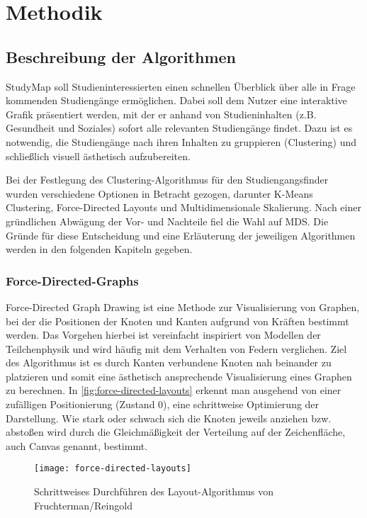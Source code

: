 \section{Methodik}\label{sec:methodik}
\subsection{Beschreibung der Algorithmen}
StudyMap soll Studieninteressierten einen schnellen Überblick über
alle in Frage kommenden Studiengänge ermöglichen.  Dabei soll dem Nutzer eine
interaktive Grafik präsentiert werden, mit der er anhand von Studieninhalten
(z.B. \glqq Gesundheit und Soziales\grqq{}) sofort alle relevanten Studiengänge
findet. Dazu ist es notwendig, die Studiengänge nach ihren Inhalten zu
gruppieren (Clustering) und schließlich visuell ästhetisch aufzubereiten.

Bei der Festlegung des Clustering-Algorithmus für den Studiengangsfinder wurden
verschiedene Optionen in Betracht gezogen, darunter K-Means Clustering,
Force-Directed Layouts und Multidimensionale Skalierung. Nach einer
gründlichen Abwägung der Vor- und Nachteile fiel die Wahl auf MDS. Die Gründe
für diese Entscheidung und eine Erläuterung der jeweiligen Algorithmen werden in
den folgenden Kapiteln gegeben.

\subsubsection{Force-Directed-Graphs}
Force-Directed Graph Drawing ist eine Methode zur Visualisierung von Graphen, bei der die Positionen der Knoten und Kanten aufgrund von Kräften bestimmt werden. Das Vorgehen hierbei ist vereinfacht inspiriert von Modellen der Teilchenphysik und wird häufig mit dem Verhalten von Federn verglichen. Ziel des Algorithmus ist es durch Kanten verbundene Knoten nah beinander zu platzieren und somit eine ästhetisch ansprechende Visualisierung eines Graphen zu berechnen. In \autoref{fig:force-directed-layouts} erkennt man ausgehend von einer zufälligen Positionierung (Zustand 0), eine schrittweise Optimierung der Darstellung. Wie stark oder schwach sich die Knoten jeweils \glqq anziehen\grqq{} bzw. \glqq abstoßen\grqq{} wird durch die Gleichmäßigkeit der Verteilung auf der Zeichenfläche, auch Canvas genannt, bestimmt. \parencite{schonfeld_fruchtermanreingold_2019}

\begin{figure}[H]
    \centering
    \texttt{[image: force-directed-layouts]}
    \caption{Schrittweises Durchführen des Layout-Algorithmus von Fruchterman/Reingold}
    \label{fig:force-directed-layouts}
\end{figure}

